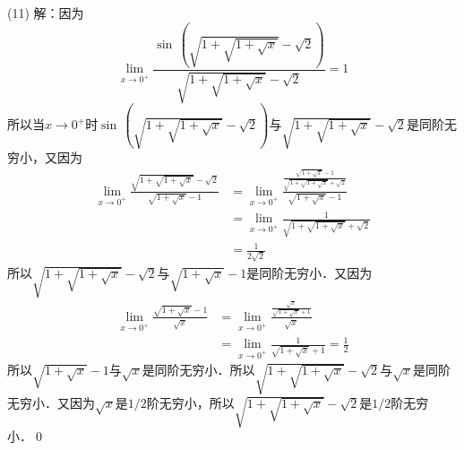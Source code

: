\medskip
(11) 解：因为
\begin{equation}
    \lim_{x \to 0^+} \displaystyle\frac{\sin \, \left(\displaystyle\sqrt{1+\displaystyle\sqrt{1+\displaystyle\sqrt{x}}}-\displaystyle\sqrt{2}\right)}{\displaystyle\sqrt{1+\displaystyle\sqrt{1+\displaystyle\sqrt{x}}}-\displaystyle\sqrt{2}} = 1
\end{equation}
所以当$x \to 0^+$时$\sin \, \left(\displaystyle\sqrt{1+\displaystyle\sqrt{1+\displaystyle\sqrt{x}}}-\displaystyle\sqrt{2}\right)$与$\displaystyle\sqrt{1+\displaystyle\sqrt{1+\displaystyle\sqrt{x}}}-\displaystyle\sqrt{2}$是同阶无穷小，又因为
\begin{align}
    \lim_{x \to 0^+} \displaystyle\frac{\displaystyle\sqrt{1+\displaystyle\sqrt{1+\displaystyle\sqrt{x}}}-\displaystyle\sqrt{2}}{\displaystyle\sqrt{1+\sqrt{x}}-1} &= \lim_{x \to 0^+} \displaystyle\frac{\displaystyle\frac{\displaystyle\sqrt{1+\displaystyle\sqrt{x}}-1}{\displaystyle\sqrt{1+\displaystyle\sqrt{1+\displaystyle\sqrt{x}}}+\displaystyle\sqrt{2}}}{\displaystyle\sqrt{1+\displaystyle\sqrt{x}}-1} \\
    &= \lim_{x \to 0^+} \displaystyle\frac{1}{\displaystyle\sqrt{1+\displaystyle\sqrt{1+\displaystyle\sqrt{x}}}+\displaystyle\sqrt{2}} \\
    &= \frac{1}{2\displaystyle\sqrt{2}}
\end{align}
所以$\displaystyle\sqrt{1+\displaystyle\sqrt{1+\displaystyle\sqrt{x}}}-\displaystyle\sqrt{2}$与$\displaystyle\sqrt{1+\displaystyle\sqrt{x}}-1$是同阶无穷小．又因为
\begin{align}
    \lim_{x \to 0^+} \displaystyle\frac{\displaystyle\sqrt{1+\displaystyle\sqrt{x}}-1}{\displaystyle\sqrt{x}} &= \lim_{x \to 0^+} \displaystyle\frac{\displaystyle\frac{\displaystyle\sqrt{x}}{\displaystyle\sqrt{1+\displaystyle\sqrt{x}}+1}}{\displaystyle\sqrt{x}} \\
    &= \lim_{x \to 0^+} \displaystyle\frac{1}{\displaystyle\sqrt{1+\displaystyle\sqrt{x}}+1} = \frac{1}{2}
\end{align}
所以$\displaystyle\sqrt{1+\displaystyle\sqrt{x}}-1$与$\displaystyle\sqrt{x}$是同阶无穷小．所以$\displaystyle\sqrt{1+\displaystyle\sqrt{1+\displaystyle\sqrt{x}}}-\displaystyle\sqrt{2}$与$\sqrt{x}$是同阶无穷小．又因为$\displaystyle\sqrt{x}$是$1/2$阶无穷小，所以$\displaystyle\sqrt{1+\displaystyle\sqrt{1+\displaystyle\sqrt{x}}}-\displaystyle\sqrt{2}$是$1/2$阶无穷小．\qed